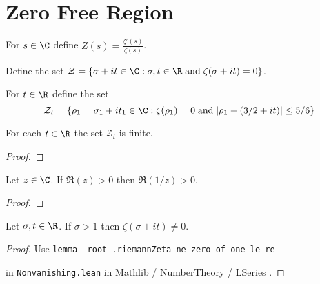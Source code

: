 \chapter{Zero Free Region}\label{zero_free_region}

\begin{definition}\label{def:logDerivZeta}  \leanok
For $s\in\C$ define $Z(s) = \frac{\zeta'(s)}{\zeta(s)}$.
\end{definition}


\begin{definition}\label{def:zeroZ}  \leanok
Define the set $\mathcal{Z} = \{ \sigma+it\in\C : \sigma,t\in\R \;{\rm and}\; \zeta(\sigma+it)=0 \}$.
\end{definition}


\begin{definition}\label{def:Z_t}  \leanok {}
For $t\in\R$ define the set $$\mathcal{Z}_t = \{\rho_1=\sigma_1+it_1\in\C : \zeta(\rho_1)=0 \; {\rm and} \; |\rho_1 - (3/2+it)| \le 5/6\}$$
\end{definition}


\begin{lemma}\label{lem:Ztfinite}  \leanok
{}
For each $t\in\R$ the set $\mathcal Z_t$ is finite.
\end{lemma}
\begin{proof}
\leanok
{}
\end{proof}



\begin{lemma}\label{lem:Re1zge0}  \leanok
Let $z\in\C$. If $\Re(z)>0$ then $\Re(1/z)>0$.
\end{lemma}
\begin{proof} \leanok
\end{proof}


\begin{lemma}\label{lem:sigmage1}  \leanok
Let $\sigma,t\in\R$. If $\sigma > 1$ then $\zeta(\sigma + it) \neq0 $.
\end{lemma}
\begin{proof} \leanok
Use {\tt lemma \_root\_.riemannZeta\_ne\_zero\_of\_one\_le\_re}

in {\tt Nonvanishing.lean} in Mathlib / NumberTheory / LSeries .
\end{proof}

